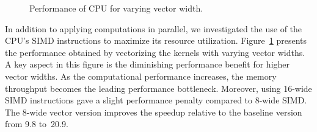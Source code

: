\begin{figure}[htb]
\centering
{}
\caption{Performance of CPU for varying vector width.}
\label{FIG-CPU-VECTOR}
\end{figure}

In addition to applying computations in parallel, we investigated the use of
the CPU's SIMD instructions to maximize its resource utilization.
Figure~\ref{FIG-CPU-VECTOR} presents the performance obtained by vectorizing
the kernels with varying vector widths. A key aspect in this figure is the
diminishing performance benefit for higher vector widths. As the computational
performance increases, the memory throughput becomes the leading performance
bottleneck. Moreover, using 16-wide SIMD instructions gave a slight performance
penalty compared to 8-wide SIMD. The 8-wide vector version improves the speedup
relative to the baseline version from 9.8 to~20.9.

